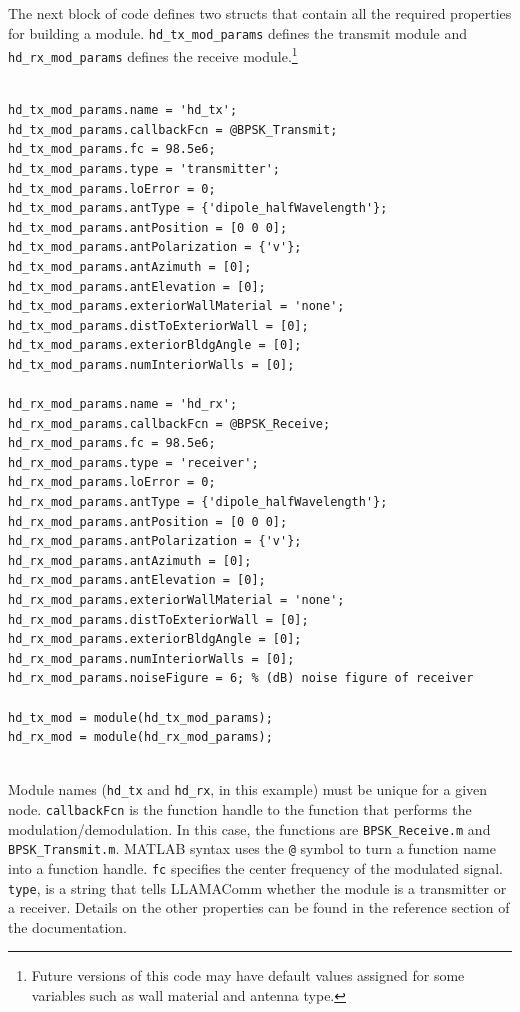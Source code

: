 The next block of code defines two structs that contain all the
required properties for building a module. \verb+hd_tx_mod_params+
defines the transmit module and \verb+hd_rx_mod_params+ defines the
receive module.\footnote{Future versions of this code may have
default values assigned for some variables such as wall material and
antenna type.}

\begin{lstlisting}[firstnumber = 22, name=hdBuildNodes]
% Define transmit/recieve modules

hd_tx_mod_params.name = 'hd_tx';
hd_tx_mod_params.callbackFcn = @BPSK_Transmit;
hd_tx_mod_params.fc = 98.5e6;
hd_tx_mod_params.type = 'transmitter';
hd_tx_mod_params.loError = 0;
hd_tx_mod_params.antType = {'dipole_halfWavelength'};
hd_tx_mod_params.antPosition = [0 0 0];
hd_tx_mod_params.antPolarization = {'v'};
hd_tx_mod_params.antAzimuth = [0];
hd_tx_mod_params.antElevation = [0];
hd_tx_mod_params.exteriorWallMaterial = 'none';
hd_tx_mod_params.distToExteriorWall = [0];
hd_tx_mod_params.exteriorBldgAngle = [0];
hd_tx_mod_params.numInteriorWalls = [0];

hd_rx_mod_params.name = 'hd_rx';
hd_rx_mod_params.callbackFcn = @BPSK_Receive;
hd_rx_mod_params.fc = 98.5e6;
hd_rx_mod_params.type = 'receiver';
hd_rx_mod_params.loError = 0;
hd_rx_mod_params.antType = {'dipole_halfWavelength'};
hd_rx_mod_params.antPosition = [0 0 0];
hd_rx_mod_params.antPolarization = {'v'};
hd_rx_mod_params.antAzimuth = [0];
hd_rx_mod_params.antElevation = [0];
hd_rx_mod_params.exteriorWallMaterial = 'none';
hd_rx_mod_params.distToExteriorWall = [0];
hd_rx_mod_params.exteriorBldgAngle = [0];
hd_rx_mod_params.numInteriorWalls = [0];
hd_rx_mod_params.noiseFigure = 6; % (dB) noise figure of receiver

hd_tx_mod = module(hd_tx_mod_params);
hd_rx_mod = module(hd_rx_mod_params);


\end{lstlisting}

Module names (\verb+hd_tx+ and \verb+hd_rx+, in this example) must
be unique for a given node.  \verb+callbackFcn+ is the function
handle to the function that performs the modulation/demodulation. In
this case, the functions are \verb+BPSK_Receive.m+ and
\verb+BPSK_Transmit.m+. MATLAB syntax uses the \verb+@+ symbol to
turn a function name into a function handle. \verb+fc+ specifies the
center frequency of the modulated signal. \verb+type+, is a string
that tells LLAMAComm whether the module is a transmitter or a
receiver. Details on the other properties can be found in the
reference section of the documentation.

